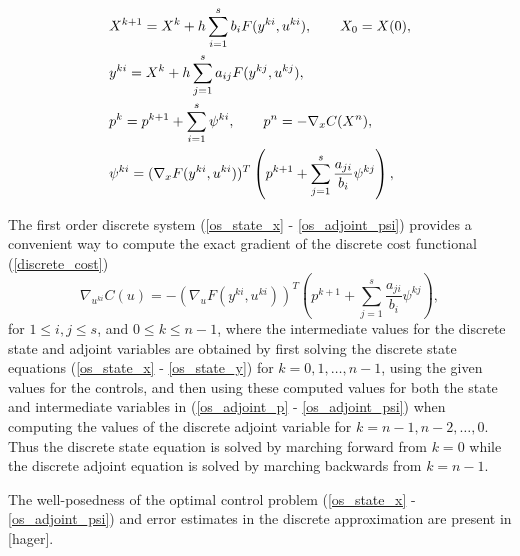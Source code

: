 \documentclass[a4paper,10pt, english]{article}
\newcommand{\D}{\displaystyle}
\begin{document}
  \begin{align}
   \D
    & X^{k+1}  = X^k + h\sum_{i=1}^{s}b_iF(y^{ki}, u^{ki}), \qquad X_0 = X(0),   \label{os_state_x}\\
 	& y^{ki} = X^k + h\sum_{j=1}^{s}a_{ij}F(y^{kj}, u^{kj}),   \label{os_state_y}\\
 	& p^k = p^{k+1} + \sum_{i=1}^{s}\psi^{ki}, \qquad p^n = - \nabla_xC(X^n),  \label{os_adjoint_p}\\
 	& \psi^{ki} = (\nabla_x F(y^{ki}, u^{ki}))^{T} \left( p^{k+1} + \sum_{j=1}^{s} \frac{a_{ji}}{b_i}\psi^{kj}\right), \label{os_adjoint_psi} 
   \end{align}

The first order discrete system (\ref{os_state_x} - \ref{os_adjoint_psi}) provides a convenient way to compute the exact gradient of the discrete cost functional (\ref{discrete_cost})
\begin{equation}
\nabla_{u^{ki}} C(u) = - (\nabla_u F(y^{ki}, u^{ki}))^{T} \left( p^{k+1} + \sum_{j=1}^{s}\frac{a_{ji}}{b_i}\psi^{kj}\right), 
\label{discretegradient}
 \end{equation}  
 for $1\leq i, j\leq s$, and $0\leq k\leq n-1$, where the intermediate values for the discrete state and adjoint variables are obtained by first
 solving the discrete state equations (\ref{os_state_x} - \ref{os_state_y}) for $k=0, 1, \dots, n-1$, using the given values for the controls, and then using these computed values for both the state and intermediate variables in (\ref{os_adjoint_p} - \ref{os_adjoint_psi}) when computing the values of the discrete adjoint variable for $k=n-1, n-2, \dots, 0$. Thus the discrete state equation is solved by marching forward from 
 $ k = 0$ while the discrete adjoint equation is solved by marching backwards from $k = n-1$.
 
 The well-posedness of the optimal control problem (\ref{os_state_x} - \ref{os_adjoint_psi}) and error estimates in the discrete approximation are present in [hager].
 
\end{document}
